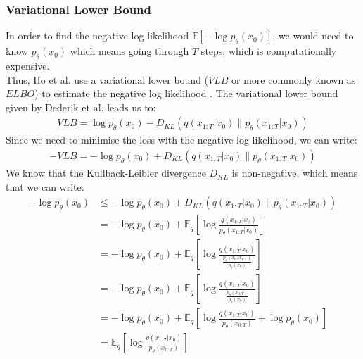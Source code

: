 \documentclass{article}
\begin{document}
\subsubsection{Variational Lower Bound}
In order to find the negative log likelihood $\mathbb{E}\left[- \log p_{\theta} \left(x_0\right)\right]$, we would need to know $p_{\theta} (x_0)$ which means going through $T$ steps, which is computationally expensive. \\
Thus, Ho et al. \cite{ho2020denoising} use a variational lower bound ($VLB$ or more commonly known as $ELBO$) to estimate the negative log likelihood \cite{ho2020denoising,sohldickstein2015deep}.
The variational lower bound given by Dederik et al. \cite{kingma2022autoencoding} leads us to:
\begin{gather}
  VLB = \log p_{\theta}\left(x_0\right) - D_{KL}\left(q\left(x_{1:T}|x_0\right) \| p_{\theta}\left(x_{1:T}|x_0\right)\right) \label{eq:7}
\end{gather}
Since we need to minimise the loss with the negative log likelihood, we can write:
\begin{gather}
  - VLB = - \log p_{\theta}\left(x_0\right) + D_{KL}\left(q\left(x_{1:T}|x_0\right) \| p_{\theta}\left(x_{1:T}|x_0\right)\right) \label{eq:8}
\end{gather}
We know that the Kullback-Leibler divergence $D_{KL}$ is non-negative, which means that we can write:
\begin{align}
  - \log p_{\theta}\left(x_0\right) &\leq - \log p_{\theta}\left(x_0\right) + D_{KL}\left(q\left(x_{1:T}|x_0\right) \| p_{\theta}\left(x_{1:T}|x_0\right)\right) \label{eq:9} \\[10pt]
  &= - \log p_{\theta}\left(x_0\right) + \mathbb{E}_q \left[\log \frac{q\left(x_{1:T}|x_0\right)}{p_{\theta}\left(x_{1:T}|x_0\right)}\right] \label{eq:10} \\[10pt]
  &= - \log p_{\theta}\left(x_0\right) + \mathbb{E}_q \left[\log \frac{q\left(x_{1:T}|x_0\right)}{\frac{p_{\theta}\left(x_0, x_{1:T}\right)}{p_{\theta}\left(x_0\right)}}\right] \\[10pt]
  &= - \log p_{\theta}\left(x_0\right) + \mathbb{E}_q \left[\log \frac{q\left(x_{1:T}|x_0\right)}{\frac{p_{\theta}\left(x_{0:T}\right)}{p_{\theta}\left(x_0\right)}}\right] \\[10pt]
  &= - \log p_{\theta}\left(x_0\right) + \mathbb{E}_q \left[\log \frac{q\left(x_{1:T}|x_0\right)}{p_{\theta}\left(x_{0:T}\right)} + \log {p_{\theta}\left(x_0\right)}\right] \\[10pt]
  &= \mathbb{E}_q \left[\log \frac{q\left(x_{1:T}|x_0\right)}{p_{\theta}\left(x_{0:T}\right)}\right]
\end{align}
\end{document}
